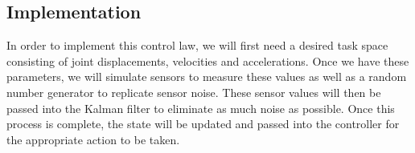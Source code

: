 	\subsection{Implementation}
		In order to implement this control law, we will first need a desired task space consisting of joint displacements, velocities and accelerations. Once we have these parameters, we will simulate sensors to measure these values as well as a random number generator to replicate sensor noise. These sensor values will then be passed into the Kalman filter to eliminate as much noise as possible. Once this process is complete, the state will be updated and passed into the controller for the appropriate action to be taken.

